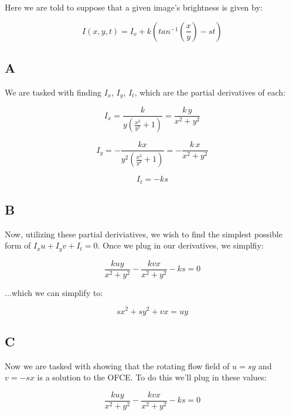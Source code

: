 \documentclass{article}
\begin{document}
Here we are told to suppose that a given image's brightness is given by:

\begin{equation}
    I(x,y,t) = I_o + k(tan^{-1}(\frac{x}{y})-st)
\end{equation}

\subsection*{A}

We are tasked with finding $I_x$, $I_y$, $I_t$, which are the partial derivatives of each:

\begin{equation}
    I_x = \frac{k}{y(\frac{x^2}{y^2}+1)} = \frac{k\,y}{x^2 +y^2 }
\end{equation}

\begin{equation}
    I_y = -\frac{kx}{y^2(\frac{x^2}{y^2}+1)} = -\frac{k\,x}{x^2 +y^2 }
\end{equation}

\begin{equation}
    I_t = -ks
\end{equation}

\subsection*{B}

Now, utilizing these partial deriviatives, we wish to find the simplest possible form of $I_x u + I_y v + I_t = 0$. Once we plug in our derivatives, we simplfiy:

\begin{equation}
    \frac{kuy}{x^2 +y^2 }-\frac{kvx}{x^2 +y^2 }-ks=0
\end{equation}

\noindent ...which we can simplify to:

\begin{equation}
    sx^2 +sy^2+vx =uy
\end{equation}

\subsection*{C}

Now we are tasked with showing that the rotating flow field of $u=sy$ and $v=-sx$ is a solution to the OFCE. To do this we'll plug in these values:

\begin{equation}
    \frac{kuy}{x^2 +y^2 }-\frac{kvx}{x^2 +y^2 }-ks=0
\end{equation}
\end{document}
